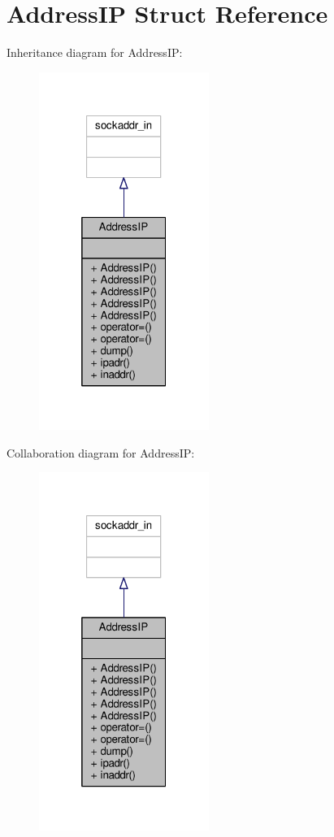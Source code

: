 \hypertarget{structAddressIP}{}\section{Address\+IP Struct Reference}
\label{structAddressIP}


Inheritance diagram for Address\+IP\+:
\nopagebreak
\begin{figure}[H]
\begin{center}
\leavevmode
\includegraphics[width=157pt]{d2/d8e/structAddressIP__inherit__graph}
\end{center}
\end{figure}


Collaboration diagram for Address\+IP\+:
\nopagebreak
\begin{figure}[H]
\begin{center}
\leavevmode
\includegraphics[width=157pt]{d3/dd1/structAddressIP__coll__graph}
\end{center}
\end{figure}
